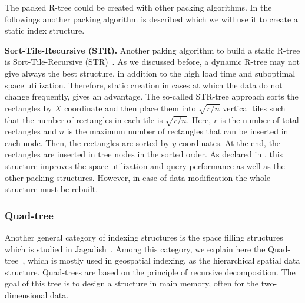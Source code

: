 \documentclass[a4paper,12pt]{article}
\begin{document}
The packed R-tree could be created with other packing algorithms. In the followings another packing algorithm is described which we will use it to create a static index structure.

\textbf{Sort-Tile-Recursive (STR).} Another paking algorithm to build a static R-tree is Sort-Tile-Recursive (STR)~\cite{strtree}. As we discussed before, a dynamic R-tree may not give always the best structure, in addition to the high load time and suboptimal space utilization. Therefore, static creation in cases at which the data do not change frequently, gives an advantage. The so-called STR-tree approach sorts the rectangles by $X$ coordinate and then place them into $\sqrt{r/n}$ vertical tiles such that the number of rectangles in each tile is $\sqrt{r/n}$. Here, $r$ is the number of total rectangles and $n$ is the maximum number of rectangles that can be inserted in each node. Then, the rectangles are sorted by $y$ coordinates. At the end, the rectangles are inserted in tree nodes in the sorted order.
As declared in \cite{strtree}, this structure improves the space utilization and query performance as well as the other packing structures. However, in case of data modification the whole structure must be rebuilt.

\subsubsection{Quad-tree}
\label{quad-tree-based}
Another general category of indexing structures is the space filling structures which is studied in Jagadish~\cite{spacefilling}.
Among this category, we explain here the Quad-tree~\cite{quadtree}, which is mostly used in geospatial indexing, as the hierarchical spatial data structure. Quad-trees are based on the principle of recursive decomposition. The goal of this tree is to design a structure in main memory, often for the two-dimensional data. 
\end{document}
